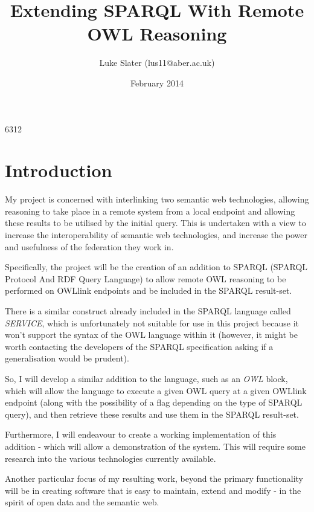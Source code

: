 \documentclass{article}
\begin{document}
\setlength{\parskip}{\medskipamount}
\setlength{\parindent}{0pt}

\title{Extending SPARQL With Remote OWL Reasoning}
\author{Luke Slater (lus11@aber.ac.uk)}
\date{February 2014}

\maketitle

\pagebreak

6312

\section{Introduction}

My project is concerned with interlinking two semantic web technologies,
allowing reasoning to take place in a remote system from a local endpoint and
allowing these results to be utilised by the initial query. This is undertaken
with a view to increase the interoperability of semantic web technologies, and
increase the power and usefulness of the federation they work in.

Specifically, the project will be the creation of an addition to
SPARQL\cite{sparql} (SPARQL Protocol And RDF Query Language) to allow remote
OWL\cite{owlprimer} reasoning to be performed on OWLlink endpoints and be included in the
SPARQL result-set.

There is a similar construct already included in the SPARQL language called
\emph{SERVICE}, which is unfortunately not suitable for use in this project
because it won't support the syntax of the OWL language within it (however, it
might be worth contacting the developers of the SPARQL specification asking if a
generalisation would be prudent).

So, I will develop a similar addition to the language, such as an \emph{OWL}
block, which will allow the language to execute a given OWL query at a given
OWLlink endpoint (along with the possibility of a flag depending on the type of
SPARQL query), and then retrieve these results and use them in the SPARQL
result-set.

Furthermore, I will endeavour to create a working implementation of this
addition - which will allow a demonstration of the system. This will require
some research into the various technologies currently available.

Another particular focus of my resulting work, beyond the primary functionality
will be in creating software that is easy to maintain, extend and modify - in
the spirit of open data and the semantic web.
\end{document}
